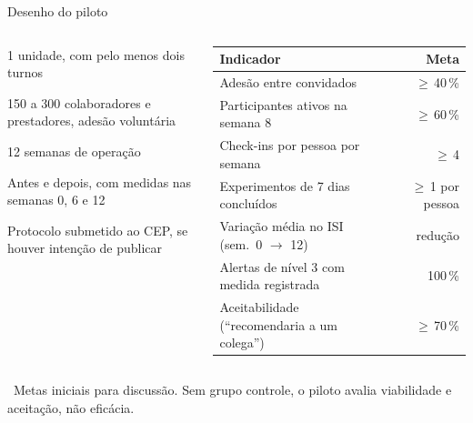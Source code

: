 \documentclass[aspectratio=169,10pt]{beamer}
\newcommand{\fonte}[1]{\par\vfill{\tiny\color{mudo}\faBookOpen\ #1\par}}
\begin{document}
\begin{frame}{Desenho do piloto}
\begin{columns}[T,onlytextwidth]
\small
\begin{description}[Duração]\setlength{\itemsep}{2pt}
  \item[Local] 1 unidade, com pelo menos dois turnos
  \item[Público] 150 a 300 colaboradores e prestadores, adesão voluntária
  \item[Duração] 12 semanas de operação
  \item[Desenho] Antes e depois, com medidas nas semanas 0, 6 e 12
  \item[Ética] Protocolo submetido ao CEP, se houver intenção de publicar
\end{description}
\scriptsize
\begin{tabularx}{\linewidth}{@{}L r@{}}
\toprule
\textbf{Indicador} & \textbf{Meta} \\
\midrule
Adesão entre convidados & $\geq$\,40\,\% \\
Participantes ativos na semana 8 & $\geq$\,60\,\% \\
Check-ins por pessoa por semana & $\geq$\,4 \\
Experimentos de 7 dias concluídos & $\geq$\,1 por pessoa \\
Variação média no ISI (sem.\ 0 $\to$ 12) & redução \\
Alertas de nível 3 com medida registrada & 100\,\% \\
Aceitabilidade (\enquote{recomendaria a um colega}) & $\geq$\,70\,\% \\
\bottomrule
\end{tabularx}
\end{columns}
\fonte{Metas iniciais para discussão. Sem grupo controle, o piloto
  avalia viabilidade e aceitação, não eficácia.}
\end{frame}
\end{document}
